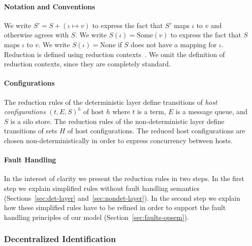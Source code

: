 \documentclass[10pt]{sigplanconf}
\theoremstyle{definition}
\theoremstyle{definition}
\begin{document}
\paragraph{Notation and Conventions}

We write $S' = S + (\iota \mapsto v)$ to express the fact that $S'$ maps
$\iota$ to $v$ and otherwise agrees with $S$. We write $S(\iota) =
\text{Some}(v)$ to express the fact that $S$ maps $\iota$ to $v$. We write
$S(\iota) = \text{None}$ if $S$ does not have a mapping for $\iota$. Reduction
is defined using reduction contexts~\cite{TAPL}. We omit the definition of
reduction contexts, since they are completely standard.

\paragraph{Configurations}

The reduction rules of the deterministic layer define transitions of \emph{host
configurations} $(t, E, S)^h$ of host $h$ where $t$ is a term, $E$ is a message
queue, and $S$ is a silo store. The reduction rules of the non-deterministic
layer define transitions of sets $H$ of host configurations. The reduced host
configurations are chosen non-deterministically in order to express concurrency
between hosts.

\paragraph{Fault Handling}

In the interest of clarity we present the reduction rules in two steps. In the
first step we explain simplified rules without fault handling semantics
(Sections~\ref{sec:det-layer} and~\ref{sec:nondet-layer}). In the second step
we explain how these simplified rules have to be refined in order to support
the fault handling principles of our model (Section~\ref{sec:faults-opsem}).

\subsubsection{Decentralized Identification}
\end{document}
